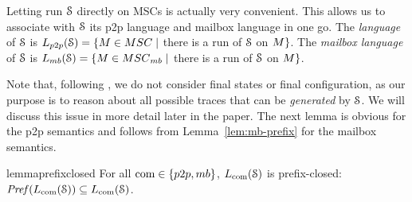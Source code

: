 \documentclass[a4paper,UKenglish,cleveref, autoref, thm-restate]{lipics-v2021}
\begin{document}
Letting run $\mathcal{S}$ directly on MSCs is actually very convenient.
This allows us to associate with $\mathcal{S}$ its p2p language and mailbox language
in one go. The \emph{\pp language} of $\mathcal{S}$ is $\ppL{\Sys} = \{\msc \in \ppMSCs \mid$ there is a run of $\mathcal{S}$ on $M\}$.
The \emph{mailbox language} of $\mathcal{S}$ is $\mbL{\Sys} = \{\msc \in \mbMSCs \mid$ there is a run of $\mathcal{S}$ on $M\}$.

Note that, following \cite{DBLP:conf/cav/BouajjaniEJQ18,DBLP:conf/fossacs/GiustoLL20},
we do not consider final states or final configuration, as our purpose is to
reason about all possible
traces that can be \emph{generated} by $\mathcal{S}$. We will discuss this issue
in more detail later in the paper.
The next lemma is obvious for the p2p semantics and follows from Lemma~\ref{lem:mb-prefix} for
	the mailbox semantics.

\begin{restatable}{lemma}{prefixclosed}
For all $\comsymb \in \{\ppsymb, \mbsymb\}$, $L_{\textup{com}}(\mathcal{S})$ is prefix-closed:
$\mathit{Pref}(L_{\textup{com}}(\mathcal{S})) \subseteq L_{\textup{com}}(\mathcal{S})$.
\end{restatable}
\end{document}
